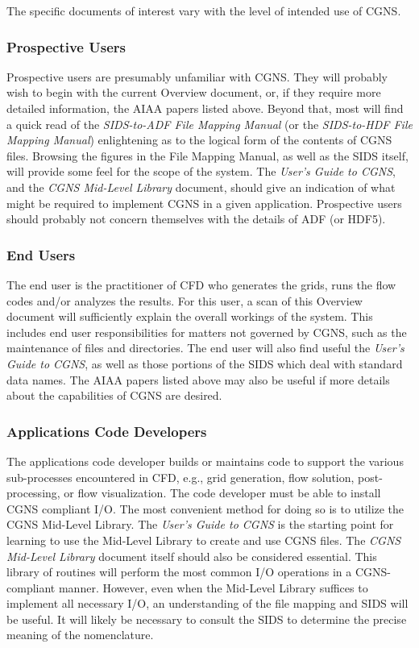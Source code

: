 \noindent
The specific documents of interest vary with the level of intended use
of CGNS.

\subsubsection{Prospective Users}

Prospective users are presumably unfamiliar with CGNS.
They will probably wish to begin with the current Overview document, or,
if they require more detailed information, the AIAA papers listed above.
Beyond that, most will find a quick read of the \textit{SIDS-to-ADF
File Mapping Manual} (or the \textit{SIDS-to-HDF File Mapping Manual})
enlightening as to the logical form of the contents of CGNS files.
Browsing the figures in the File
Mapping Manual, as well as the SIDS
itself, will provide some feel for the scope of the system.
The \textit{User's Guide to CGNS}, and
the \textit{CGNS Mid-Level Library}
document, should give an indication of what might be required to
implement CGNS in a given application.
Prospective users should probably not concern themselves with the
details of ADF (or HDF5).

\subsubsection{End Users}

The end user is the practitioner of CFD who generates the grids, runs
the flow codes and/or analyzes the results.
For this user, a scan of this Overview document will sufficiently
explain the overall workings of the system.
This includes end user responsibilities for matters not governed by
CGNS, such as the maintenance of files and directories.
The end user will also find useful the
\textit{User's Guide to CGNS}, as
well as those portions of the SIDS
which deal with standard data names.
The AIAA papers listed above may also be useful if more details about
the capabilities of CGNS are desired.

\subsubsection{Applications Code Developers}

The applications code developer builds or maintains code to support the
various sub-processes encountered in CFD, e.g., grid generation, flow
solution, post-processing, or flow visualization.
The code developer must be able to install CGNS compliant I/O.
The most convenient method for doing so is to utilize the CGNS Mid-Level
Library.
The \textit{User's Guide to CGNS} is the
starting point for learning to use the Mid-Level Library to create and
use CGNS files.
The \textit{CGNS Mid-Level Library}
document itself should also be considered essential.
This library of routines will perform the most common I/O operations in
a CGNS-compliant manner.
However, even when the Mid-Level Library suffices to implement all
necessary I/O, an understanding of the
file mapping and SIDS will be useful.
It will likely be necessary to consult the
SIDS to determine the precise meaning
of the nomenclature.


